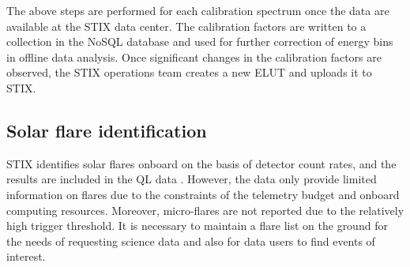 \documentclass[referee]{aa} %
\begin{document}
The above steps are performed for each calibration spectrum once the data are available at the STIX data center. 
The calibration factors are written to a collection in the NoSQL database and used for further correction of energy bins in offline data analysis.   
Once significant changes in the calibration factors are observed, the STIX operations team creates a new ELUT and uploads it to STIX.

\subsection{Solar flare identification}
STIX identifies solar flares onboard on the basis of detector count rates, and the results are included in the QL data \cite{stix2020}.  However,  the data only provide limited information on flares due to the constraints of the telemetry budget and onboard computing resources.  Moreover, micro-flares are not reported due to the relatively high trigger threshold.
It is necessary to maintain a flare list on the ground for the needs of requesting science data and also for data users to find events of interest. 
\end{document}
